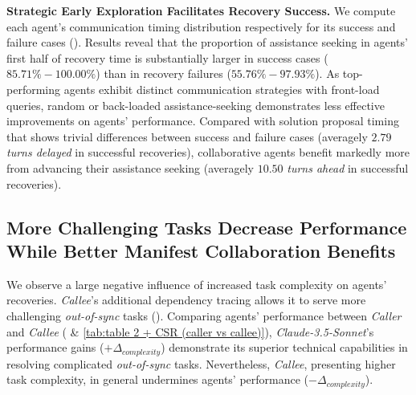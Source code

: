 \textbf{Strategic Early Exploration Facilitates Recovery Success.}
We compute each agent's communication timing distribution respectively for its success and failure cases ().
Results reveal that the proportion of assistance seeking in agents' first half of recovery time is substantially larger in success cases ($85.71\%-100.00\%$) than in recovery failures ($55.76\%-97.93\%$).
As top-performing agents exhibit distinct communication strategies with front-load queries, random or back-loaded assistance-seeking demonstrates less effective improvements on agents' performance. Compared with solution proposal timing that shows trivial differences between success and failure cases (averagely $2.79$ \textit{turns delayed} in successful recoveries), collaborative agents benefit markedly more from advancing their assistance seeking (averagely $10.50$ \textit{turns ahead} in successful recoveries).






\subsection{More Challenging Tasks Decrease Performance While Better Manifest Collaboration Benefits}
\label{Section: Effects of Task Complexity}




We observe a large negative influence of increased task complexity on agents' recoveries.
%
%
\textit{Callee}'s additional dependency tracing allows it to serve more challenging \textit{out-of-sync} tasks ().
Comparing agents' performance between \textit{Caller} and \textit{Callee} ( \& \ref{tab:table 2 + CSR (caller vs callee)}), \textit{Claude-3.5-Sonnet}'s performance gains ($+\Delta_\textit{complexity}$) demonstrate its superior technical capabilities in resolving complicated \textit{out-of-sync} tasks.
Nevertheless, \textit{Callee}, presenting higher task complexity, in general undermines agents' performance ($-\Delta_\textit{complexity}$).

